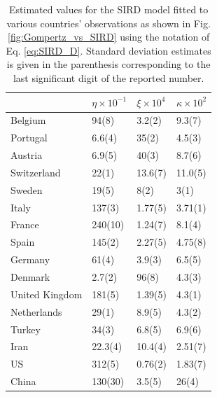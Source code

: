 \documentclass{article}
\begin{document}
\begin{table}
\centering
\caption{Estimated values for the SIRD model fitted to various countries' observations as shown in Fig. \ref{fig:Gompertz_vs_SIRD} using the notation of Eq. \ref{eq:SIRD_D}. Standard deviation estimates is given in the parenthesis corresponding to the last significant digit of the reported number.}
\begin{tabular}{llll}
\toprule
{} &           $\eta\times 10^{-1}$ &      $\xi \times 10^{4}$ &            $\kappa\times 10^{2}$ \\
\midrule
Belgium        &    94(8) &   3.2(2) &   9.3(7) \\
Portugal       &   6.6(4) &    35(2) &   4.5(3) \\
Austria        &   6.9(5) &    40(3) &   8.7(6) \\
Switzerland    &    22(1) &  13.6(7) &  11.0(5) \\
Sweden         &    19(5) &     8(2) &     3(1) \\
Italy          &   137(3) &  1.77(5) &  3.71(1) \\
France         &  240(10) &  1.24(7) &   8.1(4) \\
Spain          &   145(2) &  2.27(5) &  4.75(8) \\
Germany        &    61(4) &   3.9(3) &   6.5(5) \\
Denmark        &   2.7(2) &    96(8) &   4.3(3) \\
United Kingdom &   181(5) &  1.39(5) &   4.3(1) \\
Netherlands    &    29(1) &   8.9(5) &   4.3(2) \\
Turkey         &    34(3) &   6.8(5) &   6.9(6) \\
Iran           &  22.3(4) &  10.4(4) &  2.51(7) \\
US             &   312(5) &  0.76(2) &  1.83(7) \\
China          &  130(30) &   3.5(5) &    26(4) \\
\bottomrule
\end{tabular}

\end{table}


\end{document}
